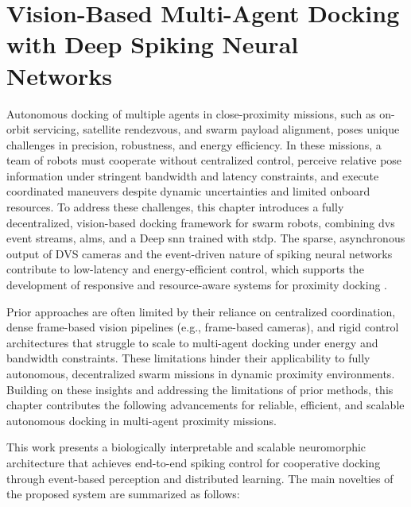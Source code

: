 \chapter{Vision-Based Multi-Agent Docking with Deep Spiking Neural Networks}

Autonomous docking of multiple agents in close-proximity missions, such as on-orbit servicing, satellite rendezvous, and swarm payload alignment, poses unique challenges in precision, robustness, and energy efficiency. In these missions, a team of robots must cooperate without centralized control, perceive relative pose information under stringent bandwidth and latency constraints, and execute coordinated maneuvers despite dynamic uncertainties and limited onboard resources. To address these challenges, this chapter introduces a fully decentralized, vision-based docking framework for swarm robots, combining \ac{dvs} event streams, \acp{alm}, and a Deep \ac{snn} trained with \ac{stdp}. The sparse, asynchronous output of DVS cameras and the event-driven nature of spiking neural networks contribute to low-latency and energy-efficient control, which supports the development of responsive and resource-aware systems for proximity docking \cite{9138762}.

Prior approaches are often limited by their reliance on centralized coordination, dense frame-based vision pipelines (e.g., frame-based cameras), and rigid control architectures that struggle to scale to multi-agent docking under energy and bandwidth constraints. These limitations hinder their applicability to fully autonomous, decentralized swarm missions in dynamic proximity environments. Building on these insights and addressing the limitations of prior methods, this chapter contributes the following advancements for reliable, efficient, and scalable autonomous docking in multi-agent proximity missions. 

This work presents a biologically interpretable and scalable neuromorphic architecture that achieves end-to-end spiking control for cooperative docking through event-based perception and distributed learning. The main novelties of the proposed system are summarized as follows:

